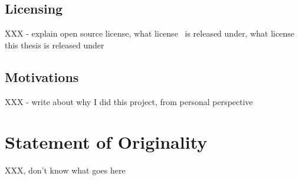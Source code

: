 \section*{Licensing}

XXX - explain open source license, what license \aicat\ is released
under, what license this thesis is released under

\section*{Motivations}

XXX - write about why I did this project, from personal perspective

\chapter*{Statement of Originality}
XXX, don't know what goes here
